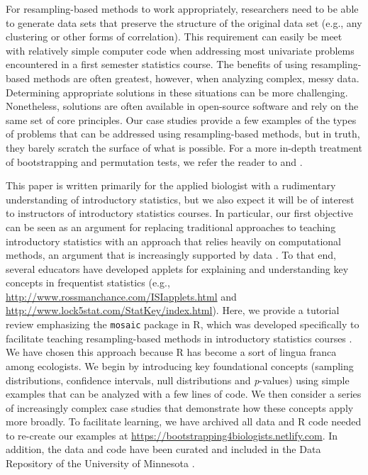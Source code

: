 \documentclass[fleqn,10pt]{wlpeerj} %
\begin{document}
For resampling-based methods to work appropriately, researchers need to be able to generate data sets that preserve the structure of the original data set (e.g., any clustering or other forms of correlation). This requirement can easily be meet with relatively simple computer code when addressing most univariate problems encountered in a first semester statistics course. The benefits of using resampling-based methods are often greatest, however, when analyzing complex, messy data. Determining appropriate solutions in these situations can be more challenging. Nonetheless, solutions are often available in open-source software and rely on the same set of core principles. Our case studies provide a few examples of the types of problems that can be addressed using resampling-based methods, but in truth, they barely scratch the surface of what is possible. For a more in-depth treatment of bootstrapping and permutation tests, we refer the reader to \citet{davison_hinkley_1997} and \citet{manly2018randomization}.

This paper is written primarily for the applied biologist with a rudimentary understanding of introductory statistics, but we also expect it will be of interest to instructors of introductory statistics courses. In particular, our first objective can be seen as an argument for replacing traditional approaches to teaching introductory statistics with an approach that relies heavily on computational methods, an argument that is increasingly supported by data \citep{Tintle2011, tintle2012retention, Tintle2015, Chance2016, Vanderstoep}. To that end, several educators have developed applets for explaining and understanding key concepts in frequentist statistics (e.g., \url{http://www.rossmanchance.com/ISIapplets.html} and \url{http://www.lock5stat.com/StatKey/index.html}). Here, we provide a tutorial review emphasizing the \texttt{mosaic} package in R, which was developed specifically to facilitate teaching resampling-based methods in introductory statistics courses \citep{pruim2017mosaic}. We have chosen this approach because R has become a sort of lingua franca among ecologists. We begin by introducing key foundational concepts (sampling distributions, confidence intervals, null distributions and \emph{p}-values) using simple examples that can be analyzed with a few lines of code. We then consider a series of increasingly complex case studies that demonstrate how these concepts apply more broadly. To facilitate learning, we have archived all data and R code needed to re-create our examples at \url{https://bootstrapping4biologists.netlify.com}. In addition, the data and code have been curated and included in the Data Repository of the University of Minnesota \citep{fiebergDRUMb4b}.
\end{document}
